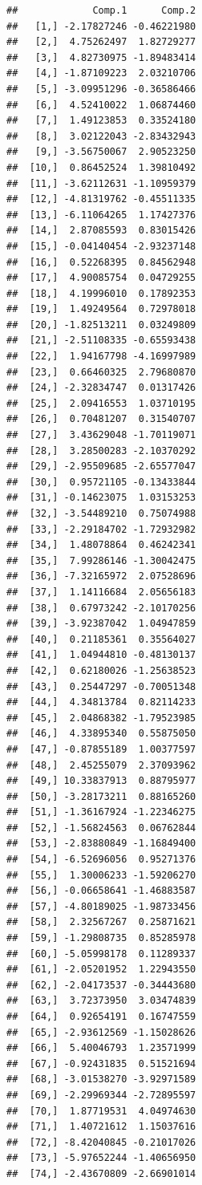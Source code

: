 \documentclass[
]{article}
\begin{document}
\begin{verbatim}
##             Comp.1      Comp.2
##   [1,] -2.17827246 -0.46221980
##   [2,]  4.75262497  1.82729277
##   [3,]  4.82730975 -1.89483414
##   [4,] -1.87109223  2.03210706
##   [5,] -3.09951296 -0.36586466
##   [6,]  4.52410022  1.06874460
##   [7,]  1.49123853  0.33524180
##   [8,]  3.02122043 -2.83432943
##   [9,] -3.56750067  2.90523250
##  [10,]  0.86452524  1.39810492
##  [11,] -3.62112631 -1.10959379
##  [12,] -4.81319762 -0.45511335
##  [13,] -6.11064265  1.17427376
##  [14,]  2.87085593  0.83015426
##  [15,] -0.04140454 -2.93237148
##  [16,]  0.52268395  0.84562948
##  [17,]  4.90085754  0.04729255
##  [18,]  4.19996010  0.17892353
##  [19,]  1.49249564  0.72978018
##  [20,] -1.82513211  0.03249809
##  [21,] -2.51108335 -0.65593438
##  [22,]  1.94167798 -4.16997989
##  [23,]  0.66460325  2.79680870
##  [24,] -2.32834747  0.01317426
##  [25,]  2.09416553  1.03710195
##  [26,]  0.70481207  0.31540707
##  [27,]  3.43629048 -1.70119071
##  [28,]  3.28500283 -2.10370292
##  [29,] -2.95509685 -2.65577047
##  [30,]  0.95721105 -0.13433844
##  [31,] -0.14623075  1.03153253
##  [32,] -3.54489210  0.75074988
##  [33,] -2.29184702 -1.72932982
##  [34,]  1.48078864  0.46242341
##  [35,]  7.99286146 -1.30042475
##  [36,] -7.32165972  2.07528696
##  [37,]  1.14116684  2.05656183
##  [38,]  0.67973242 -2.10170256
##  [39,] -3.92387042  1.04947859
##  [40,]  0.21185361  0.35564027
##  [41,]  1.04944810 -0.48130137
##  [42,]  0.62180026 -1.25638523
##  [43,]  0.25447297 -0.70051348
##  [44,]  4.34813784  0.82114233
##  [45,]  2.04868382 -1.79523985
##  [46,]  4.33895340  0.55875050
##  [47,] -0.87855189  1.00377597
##  [48,]  2.45255079  2.37093962
##  [49,] 10.33837913  0.88795977
##  [50,] -3.28173211  0.88165260
##  [51,] -1.36167924 -1.22346275
##  [52,] -1.56824563  0.06762844
##  [53,] -2.83880849 -1.16849400
##  [54,] -6.52696056  0.95271376
##  [55,]  1.30006233 -1.59206270
##  [56,] -0.06658641 -1.46883587
##  [57,] -4.80189025 -1.98733456
##  [58,]  2.32567267  0.25871621
##  [59,] -1.29808735  0.85285978
##  [60,] -5.05998178  0.11289337
##  [61,] -2.05201952  1.22943550
##  [62,] -2.04173537 -0.34443680
##  [63,]  3.72373950  3.03474839
##  [64,]  0.92654191  0.16747559
##  [65,] -2.93612569 -1.15028626
##  [66,]  5.40046793  1.23571999
##  [67,] -0.92431835  0.51521694
##  [68,] -3.01538270 -3.92971589
##  [69,] -2.29969344 -2.72895597
##  [70,]  1.87719531  4.04974630
##  [71,]  1.40721612  1.15037616
##  [72,] -8.42040845 -0.21017026
##  [73,] -5.97652244 -1.40656950
##  [74,] -2.43670809 -2.66901014

\end{verbatim}
\end{document}
